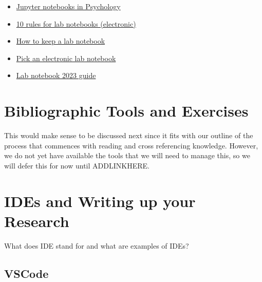 \documentclass[
  letterpaper,
  DIV=11,
  numbers=noendperiod]{scrreprt}
\providecommand{\tightlist}{%
  \setlength{\itemsep}{0pt}\setlength{\parskip}{0pt}}\usepackage{longtable,booktabs,array}
\begin{document}
\begin{itemize}
\tightlist
\item
  \href{https://www.tqmp.org/RegularArticles/vol14-2/p137/p137.pdf}{Jupyter
  notebooks in Psychology}
\item
  \href{https://journals.plos.org/ploscompbiol/article?id=10.1371/journal.pcbi.1012170}{10
  rules for lab notebooks (electronic)}
\item
  \href{https://www.science.org/content/article/how-keep-lab-notebook}{How
  to keep a lab notebook}
\item
  \href{https://www.nature.com/articles/d41586-018-05895-3}{Pick an
  electronic lab notebook}
\item
  \href{https://labfolder.com/electronic-lab-notebook-eln-research-guide/}{Lab
  notebook 2023 guide}
\end{itemize}

\section{Bibliographic Tools and
Exercises}\label{bibliographic-tools-and-exercises}

This would make sense to be discussed next since it fits with our
outline of the process that commences with reading and cross referencing
knowledge. However, we do not yet have available the tools that we will
need to manage this, so we will defer this for now until ADDLINKHERE.

\section{IDEs and Writing up your
Research}\label{ides-and-writing-up-your-research}

\begin{tcolorbox}[enhanced jigsaw, opacityback=0, leftrule=.75mm, colback=white, left=2mm, titlerule=0mm, toprule=.15mm, toptitle=1mm, coltitle=black, title=\textcolor{quarto-callout-tip-color}{\faLightbulb}\hspace{0.5em}{Class Question}, opacitybacktitle=0.6, colbacktitle=quarto-callout-tip-color!10!white, breakable, bottomrule=.15mm, bottomtitle=1mm, colframe=quarto-callout-tip-color-frame, arc=.35mm, rightrule=.15mm]

What does IDE stand for and what are examples of IDEs?

\end{tcolorbox}

\subsection{VSCode}\label{vscode}
\end{document}
